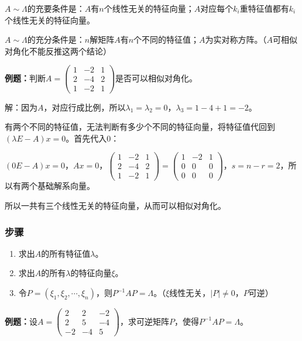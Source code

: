 \documentclass[UTF8, 12pt]{ctexart}
\begin{document}
$A\sim\Lambda$的充要条件是：$A$有$n$个线性无关的特征向量；$A$对应每个$k_i$重特征值都有$k_i$个线性无关的特征向量。

$A\sim\Lambda$的充分条件是：$n$解矩阵$A$有$n$个不同的特征值；$A$为实对称方阵。（$A$可相似对角化不能反推这两个结论）

\textbf{例题：}判断$A=\left(\begin{array}{ccc}
    1 & -2 & 1 \\
    2 & -4 & 2 \\
    1 & -2 & 1
\end{array}\right)$是否可以相似对角化。

解：因为$A$，对应行成比例，所以$\lambda_1=\lambda_2=0$，$\lambda_3=1-4+1=-2$。

有两个不同的特征值，无法判断有多少个不同的特征向量，将特征值代回到$(\lambda E-A)x=0$。首先代入0：

$(0E-A)x=0$，$Ax=0$，$\left(\begin{array}{ccc}
    1 & -2 & 1 \\
    2 & -4 & 2 \\
    1 & -2 & 1
\end{array}\right)=\left(\begin{array}{ccc}
    1 & -2 & 1 \\
    0 & 0 & 0 \\
    0 & 0 & 0
\end{array}\right)$，$s=n-r=2$，所以有两个基础解系向量。

所以一共有三个线性无关的特征向量，从而可以相似对角化。

\subsubsection{步骤}

\begin{enumerate}
    \item 求出$A$的所有特征值$\lambda$。
    \item 求出$A$的所有$\lambda$的特征向量$\xi$。
    \item 令$P=(\xi_1,\xi_2,\cdots,\xi_n)$，则$P^{-1}AP=\Lambda$。（$\xi$线性无关，$\vert P\vert\neq0$，$P$可逆）
\end{enumerate}

\textbf{例题：}设$A=\left(\begin{array}{ccc}
    2 & 2 & -2 \\
    2 & 5 & -4 \\
    -2 & -4 & 5
\end{array}\right)$，求可逆矩阵$P$，使得$P^{-1}AP=\Lambda$。
\end{document}
